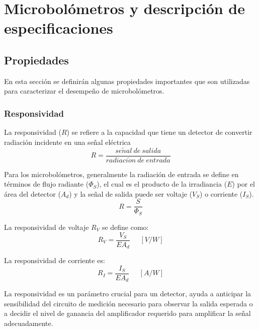 \chapter{Microbolómetros y descripción de especificaciones}

    \section{Propiedades}
    En esta sección se definirán algunas propiedades importantes que son utilizadas para caracterizar el desempeño de microbolómetros.
        \subsection{Responsividad}
        La responsividad ($R$) se refiere a la capacidad que tiene un detector de convertir radiación incidente en una señal eléctrica
        \begin{equation}
        R = \frac{se\tilde{n}al\ de\ salida}{radiaci\acute{o}n\ de\ entrada}
        \label{eq:Responsividad_0}
        \end{equation}
        
        Para los microbolómetros, generalmente la radiación de entrada se define en términos de flujo radiante ($\Phi_{S}$), el cual es el producto de la irradiancia ($E$) por el área del detector ($A_{d}$) y la señal de salida  puede ser voltaje ($V_{S}$) o corriente ($I_{S}$).
        \begin{equation}
        R = \frac{S}{\Phi_{S}}
        \label{eq:Responsividad}
        \end{equation}
        
        La responsividad de voltaje $R_{V}$ se define como:
        \begin{equation}
        R_{V} = \frac{V_{S}}{EA_{d}}\phantom{abc} [V/W]
        \label{eq:Responsividad-voltaje}
        \end{equation}
        
        La responsividad de corriente es:
        \begin{equation}
        R_{I} = \frac{I_{S}}{EA_{d}}\phantom{abc} [A/W]
        \label{eq:Responsividad-corriente}
        \end{equation}
        
        La responsividad es un parámetro crucial para un detector, ayuda a anticipar la sensibilidad del circuito de medición necesario para observar la salida esperada o a decidir el nivel de ganancia del amplificador requerido para amplificar la señal adecuadamente.
        

